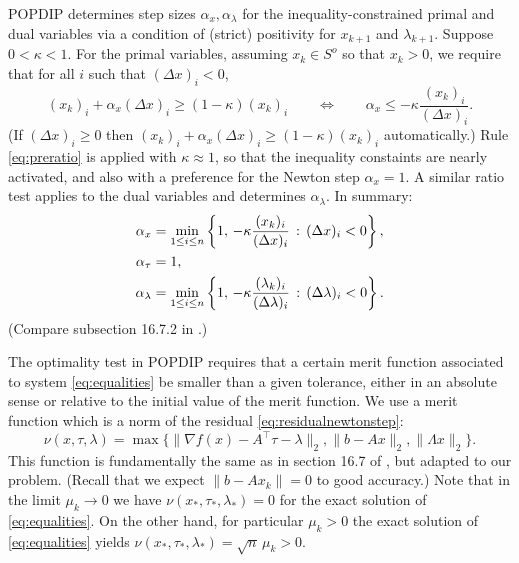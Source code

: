 \documentclass[11pt]{article}
\newcommand{\grad}{\nabla}
\begin{document}
POPDIP determines step sizes $\alpha_x,\alpha_\lambda$ for the inequality-constrained primal and dual variables via a condition of (strict) positivity for $x_{k+1}$ and $\lambda_{k+1}$.  Suppose $0<\kappa<1$.  For the primal variables, assuming $x_k\in S^o$ so that $x_k>0$, we require that for all $i$ such that $(\Delta x)_i < 0$,
\begin{equation}
(x_k)_i + \alpha_x (\Delta x)_i \ge (1-\kappa) (x_k)_i \qquad \iff \qquad \alpha_x \le - \kappa \frac{(x_k)_i}{(\Delta x)_i}. \label{eq:preratio}
\end{equation}
(If $(\Delta x)_i \ge 0$ then $(x_k)_i + \alpha_x (\Delta x)_i \ge (1-\kappa) (x_k)_i$ automatically.)  Rule \eqref{eq:preratio} is applied with $\kappa \approx 1$, so that the inequality constaints are nearly activated, and also with a preference for the Newton step $\alpha_x=1$.  A similar ratio test applies to the dual variables and determines $\alpha_\lambda$.  In summary:
\begin{align}
\alpha_x &= \min_{1\le i\le n} \left\{1, \,-\kappa \frac{(x_k)_i}{(\Delta x)_i} \,:\, (\Delta x)_i < 0\right\}, \label{eq:ratiotests} \\
\alpha_\tau &= 1, \notag \\
\alpha_\lambda &= \min_{1\le i\le n} \left\{1, \,-\kappa \frac{(\lambda_k)_i}{(\Delta \lambda)_i} \,:\, (\Delta \lambda)_i < 0\right\}. \notag
\end{align}
(Compare subsection 16.7.2 in \cite{GrivaNashSofer2009}.)

The optimality test in POPDIP requires that a certain merit function associated to system \eqref{eq:equalities} be smaller than a given tolerance, either in an absolute sense or relative to the initial value of the merit function.  We use a merit function which is a norm of the residual \eqref{eq:residualnewtonstep}:
\begin{equation}
    \nu(x,\tau,\lambda) = \max\{\|\grad f(x)-A^\top \tau - \lambda\|_2,\|b-Ax\|_2,\|\Lambda x\|_2\}.  \label{eq:meritfunction}
\end{equation}
This function is fundamentally the same as in section 16.7 of \cite{GrivaNashSofer2009}, but adapted to our problem.  (Recall that we expect $\|b-Ax_k\|=0$ to good accuracy.)  Note that in the limit $\mu_k\to 0$ we have $\nu(x_*,\tau_*,\lambda_*) = 0$ for the exact solution of \eqref{eq:equalities}.  On the other hand, for particular $\mu_k > 0$ the exact solution of \eqref{eq:equalities} yields $\nu(x_*,\tau_*,\lambda_*)=\sqrt{n}\, \mu_k>0$.
\end{document}
